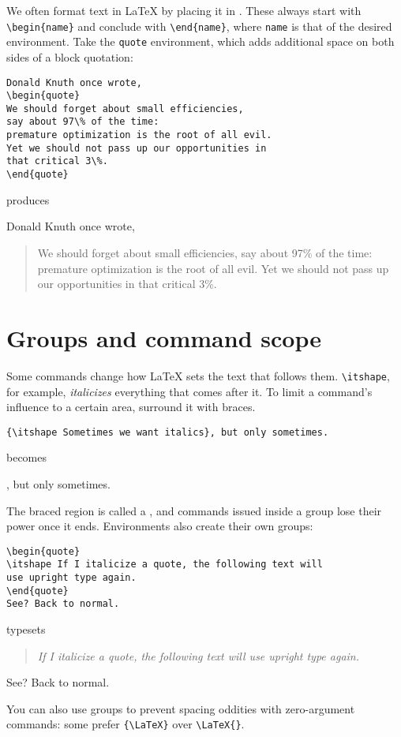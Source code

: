We often format text in \LaTeX{} by placing it in .
These always start with \verb|\begin{name}| and conclude with \verb|\end{name}|,
where \texttt{name} is that of the desired environment.
Take the \texttt{quote} environment,
which adds additional space on both sides of a block quotation:
\begin{leftfigure}
\begin{lstlisting}
Donald Knuth once wrote,
\begin{quote}
We should forget about small efficiencies,
say about 97\% of the time:
premature optimization is the root of all evil.
Yet we should not pass up our opportunities in
that critical 3\%.
\end{quote}
\end{lstlisting}
\end{leftfigure}
produces
\begin{leftfigure}
\lm
Donald Knuth once wrote,
\begin{quote}
We should forget about small efficiencies,
say about 97\% of the time:
premature optimization is the root of all evil.
Yet we should not pass up our opportunities in
that critical 3\%.
\end{quote}
\end{leftfigure}

\section{Groups and command scope}
Some commands change how \LaTeX{} sets the text that follows them.
\verb|\itshape|, for example, \textit{italicizes} everything that comes after it.
To limit a command's influence to a certain area, surround it with braces.
\begin{leftfigure}
\begin{lstlisting}
{\itshape Sometimes we want italics}, but only sometimes.
\end{lstlisting}
\end{leftfigure}
becomes
\begin{leftfigure}
, but only sometimes.
\end{leftfigure}
The braced region is called a ,
and commands issued inside a group lose their power once it ends.
Environments also create their own groups:
\begin{leftfigure}
\begin{lstlisting}
\begin{quote}
\itshape If I italicize a quote, the following text will
use upright type again.
\end{quote}
See? Back to normal.
\end{lstlisting}
\end{leftfigure}
typesets
\begin{leftfigure}
\lm
\begin{quote}
\itshape If I italicize a quote, the following text will
use upright type again.
\end{quote}
See? Back to normal.
\end{leftfigure}
You can also use groups to prevent spacing oddities with zero-argument
commands: some prefer \verb|{\LaTeX}| over \verb|\LaTeX{}|.
